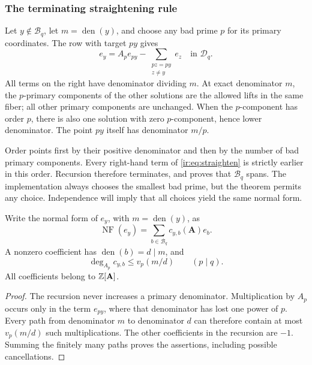 \subsubsection{The terminating straightening rule}
Let $y\notin\mathcal B_q$, let $m=\operatorname{den}(y)$, and choose any bad prime $p$ for
its primary coordinates. The row with target $py$ gives
\begin{equation}\label{ir:eq:straighten}
 e_y=A_pe_{py}-\sum_{\substack{pz=py\\z\ne y}}e_z
       \quad\text{in }\mathcal D_q.
\end{equation}
All terms on the right have denominator dividing $m$.
At exact denominator $m$, the $p$-primary components of the other
solutions are the allowed lifts in the same fiber; all other primary
components are unchanged. When the $p$-component has order $p$, there
is also one solution with zero $p$-component, hence lower denominator.
The point $py$ itself has denominator $m/p$.

Order points first by their positive denominator and then by the number
of bad primary components. Every right-hand term of
\eqref{ir:eq:straighten} is strictly earlier in this order. Recursion
therefore terminates, and proves that $\mathcal B_q$ spans. The implementation
always chooses the smallest bad prime, but the theorem permits any
choice. Independence will imply that all choices yield the same
normal form.

\begin{proposition}\label{ir:prop:support}
Write the normal form of $e_y$, with $m=\operatorname{den}(y)$, as
\[
 \operatorname{NF}(e_y)=\sum_{b\in\mathcal B_q}c_{y,b}(\mathbf A)e_b.
\]
A nonzero coefficient has $\operatorname{den}(b)=d\mid m$, and
\begin{equation}\label{ir:eq:degree-bound}
 \deg_{A_p}c_{y,b}\le v_p(m/d)\qquad(p\mid q).
\end{equation}
All coefficients belong to $\mathbb{Z}[\mathbf A]$.
\end{proposition}
\begin{proof}
The recursion never increases a primary denominator. Multiplication by
$A_p$ occurs only in the term $e_{py}$, where that denominator has
lost one power of $p$. Every path from denominator $m$ to denominator
$d$ can therefore contain at most $v_p(m/d)$ such multiplications.
The other coefficients in the recursion are $-1$. Summing the finitely
many paths proves the assertions, including possible cancellations.
\end{proof}

